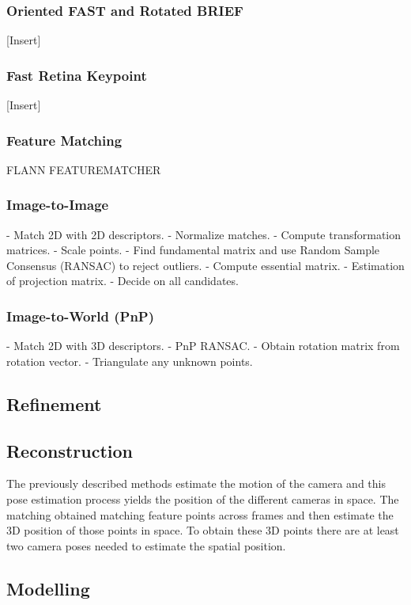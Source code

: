 \documentclass[a4paper]{article}
\begin{document}
\subsubsection*{Oriented FAST and Rotated BRIEF}
[Insert]
\subsubsection*{Fast Retina Keypoint}
[Insert]

\subsubsection{Feature Matching}
FLANN FEATUREMATCHER \citep{Muja2009}

\subsubsection{Image-to-Image}
- Match 2D with 2D descriptors.
- Normalize matches.
- Compute transformation matrices.
- Scale points.
- Find fundamental matrix and use Random Sample Consensus (RANSAC) to reject
outliers. \citep{fischler1981random}
- Compute essential matrix.
- Estimation of projection matrix.
- Decide on all candidates.

\subsubsection{Image-to-World (PnP)}
- Match 2D with 3D descriptors.
- PnP RANSAC.
- Obtain rotation matrix from rotation vector.
- Triangulate any unknown points.

\subsection{Refinement}

\subsection{Reconstruction}
The previously described methods estimate the motion of the camera and this
pose estimation process yields the position of the different cameras in space.
The matching obtained matching feature points across frames and then estimate
the 3D position of those points in space. To obtain these 3D points there are
at least two camera poses needed to estimate the spatial position.

\subsection{Modelling}
\end{document}
